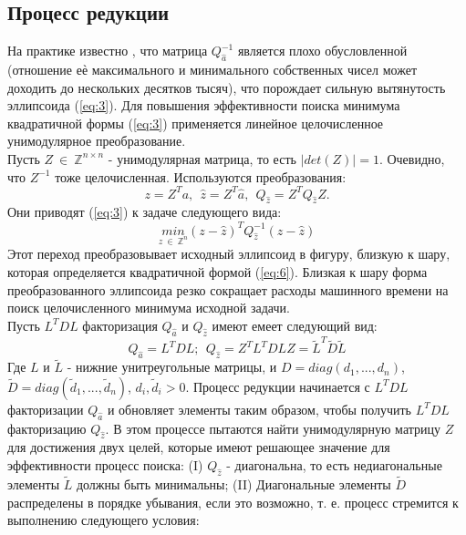 \documentclass[12pt]{matmex-diploma}
\begin{document}
\subsection{Процесс редукции}
На практике известно \cite{article:ppp}, что матрица $Q_{\hat{a}}^{-1}$ является
плохо обусловленной (отношение еѐ максимального и минимального собственных
чисел может доходить до нескольких десятков тысяч), что порождает сильную
вытянутость эллипсоида (\ref{eq:3}). Для повышения
эффективности поиска минимума квадратичной формы (\ref{eq:3})
применяется линейное целочисленное унимодулярное преобразование.\\
Пусть $Z \ \in \ \mathbb{Z}^{n \times n}$ - унимодулярная матрица, то есть $|det(Z)|=1$.
Очевидно, что $Z^{-1}$ тоже целочисленная. Используются преобразования:
 \begin{equation}
        z = Z^T a, \ \ \hat{z} = Z^T \hat{a}, \ \ Q_{\hat{z}} = Z^T Q_{\hat{z}} Z.
        \label{eq:5}
 \end{equation}
Они приводят (\ref{eq:3}) к задаче следующего вида:
 \begin{equation}
        \underset{z \ \in \ \mathbb{Z}^n}{min} (z - \hat{z})^TQ_{\hat{z}}^{-1}(z - \hat{z})
        \label{eq:6}
 \end{equation}
Этот переход преобразовывает исходный эллипсоид в фигуру, близкую к шару,
которая определяется квадратичной формой (\ref{eq:6}). Близкая к шару форма
преобразованного эллипсоида резко сокращает расходы машинного времени на поиск
целочисленного минимума исходной задачи.\\
Пусть $L^T D L$ факторизация $Q_{\hat{a}}$ и $Q_{\hat{z}}$ имеют 
емеет следующий вид:
 \begin{equation}
        Q_{\hat{a}} = L^T D L; \ \ Q_{\hat{z}} = Z^T L^T D L Z = \tilde{L}^T \tilde{D} \tilde{L}
        \label{eq:7}
 \end{equation}
 Где $L$ и $\tilde{L}$ - нижние унитреугольные матрицы, и $D = diag(d_1,...,d_n)$, 
 $\tilde{D} = diag(\tilde{d}_1,...,\tilde{d}_n)$, $d_i, \tilde{d}_i > 0$. Процесс
 редукции начинается с $L^T D L$ факторизации $Q_{\hat{a}}$ и обновляет элементы
 таким образом, чтобы получить $L^T D L$ факторизацию $Q_{\hat{z}}$. 
 В этом процессе пытаются найти унимодулярную матрицу $Z$ для достижения
 двух целей, которые имеют решающее значение для эффективности процесс поиска:
 (I) $Q_{\hat{z}}$ - диагональна, то есть недиагональные
 элементы $\tilde{L}$ должны быть минимальны;
 (II) Диагональные элементы $\tilde{D}$ распределены в порядке убывания,
 если это возможно, т. е. процесс стремится к выполнению следующего условия:
\end{document}
